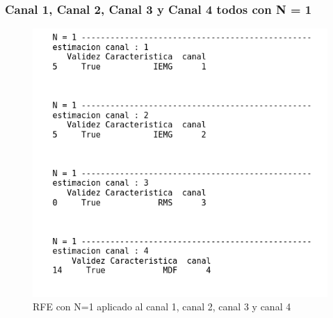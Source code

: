         \subsubsection{Canal 1, Canal 2, Canal 3 y Canal 4 todos con N = 1} 
        \begin{figure}[ht]
            \centering
            \includegraphics[scale=0.3]{imagenes/N1 canales 1234.png}
            \caption{RFE con N=1 aplicado al canal 1, canal 2, canal 3 y canal 4}
            \label{fig:N1 canal 1234}
        \end{figure}
        
